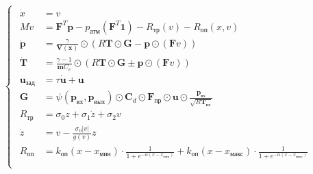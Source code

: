 \begin{equation}\label{eq:ch2/final_system}
    \begin{cases}
        \begin{alignedat}{2}
            \dot{x}               & = v                                                                                                                                                                                                   \\
            M\dot{v}              & = \mathbf{F}^T\mathbf{p} - p_\text{атм}(\mathbf{F}^T\mathbf{1}) - R_\text{тр}(v) - R_\text{оп}(x, v)                                                                                                  \\
            \dot{\mathbf{p}}      & = \frac{\gamma}{\mathbf{V}(\mathbf{x})} \odot (R\mathbf{T} \odot \mathbf{G} - \mathbf{p} \odot (\mathbf{F}v))                                                                                         \\
            \dot{\mathbf{T}}      & = \frac{\gamma-1}{\mathbf{m}C_v} \odot (R\mathbf{T} \odot \mathbf{G} \pm \mathbf{p} \odot (\mathbf{F}v))                                                                                              \\
            \mathbf{u}_\text{зад} & = \tau \dot{\mathbf{u}} + \mathbf{u}                                                                                                                                                                  \\
            \mathbf{G}            & = \psi(\mathbf{p}_\text{вх}, \mathbf{p}_\text{вых}) \odot \mathbf{C}_d \odot \mathbf{F}_\text{пр} \odot \mathbf{u} \odot \frac{\mathbf{p}_\text{вх}}{\sqrt{R\mathbf{T}_\text{вх}}}                    \\
            R_\text{тр} &= \sigma_0 z + \sigma_1 \dot{z} + \sigma_2 v                                                                                                                              \\
            \dot{z} &= v - \frac{\sigma_0 |v|}{g(v)}z \\
            R_\text{оп}           & = k_\text{оп}(x - x_\text{мин})\cdot \frac{1}{1 + e^{-\alpha(x - x_\text{мин})}} + k_\text{оп}(x - x_\text{макс})\cdot \frac{1}{1 + e^{-\alpha(x - x_\text{макс})}}                                   \\
        \end{alignedat}
    \end{cases}
\end{equation}

